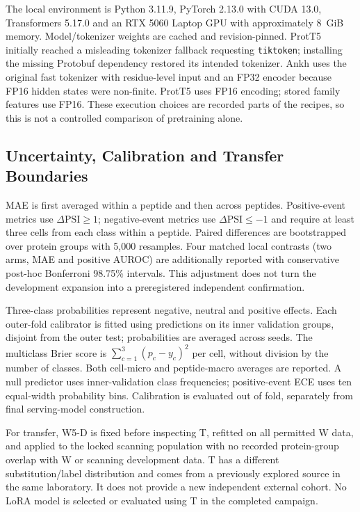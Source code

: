 The local environment is Python 3.11.9, PyTorch 2.13.0 with CUDA 13.0, Transformers 5.17.0 and
an RTX 5060 Laptop GPU with approximately 8~GiB memory. Model/tokenizer weights are cached and
revision-pinned. ProtT5 initially reached a misleading tokenizer fallback requesting \texttt{tiktoken};
installing the missing Protobuf dependency restored its intended tokenizer. Ankh uses the original
fast tokenizer with residue-level input and an FP32 encoder because FP16 hidden states were
non-finite. ProtT5 uses FP16 encoding; stored family features use FP16. These execution choices are
recorded parts of the recipes, so this is not a controlled comparison of pretraining alone.

\subsection{Uncertainty, Calibration and Transfer Boundaries}
MAE is first averaged within a peptide and then across peptides. Positive-event metrics use
$\Delta\mathrm{PSI}\ge1$; negative-event metrics use $\Delta\mathrm{PSI}\le-1$ and require at least
three cells from each class within a peptide. Paired differences are bootstrapped over protein
groups with 5,000 resamples. Four matched local contrasts (two arms, MAE and positive AUROC)
are additionally reported with conservative post-hoc Bonferroni 98.75\% intervals. This adjustment
does not turn the development expansion into a preregistered independent confirmation.

Three-class probabilities represent negative, neutral and positive effects. Each outer-fold
calibrator is fitted using predictions on its inner validation groups, disjoint from the outer test;
probabilities are averaged across seeds. The multiclass Brier score is
$\sum_{c=1}^{3}(p_c-y_c)^2$ per cell, without division by the number of classes. Both cell-micro and
peptide-macro averages are reported. A null predictor uses inner-validation class frequencies;
positive-event ECE uses ten equal-width probability bins. Calibration is evaluated out of fold,
separately from final serving-model construction.

For transfer, W5-D is fixed before inspecting T, refitted on all permitted W data, and applied to
the locked scanning population with no recorded protein-group overlap with W or scanning development
data. T has a different substitution/label distribution and comes from a previously explored source
in the same laboratory. It does not provide a new independent external cohort. No LoRA model is
selected or evaluated using T in the completed campaign.
